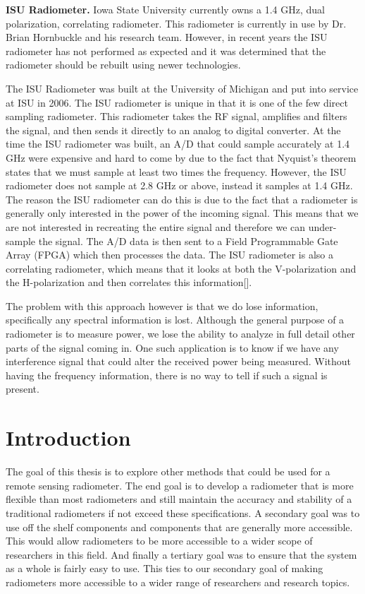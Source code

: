 \textbf{ISU Radiometer.}  Iowa State University currently owns a 1.4 GHz, dual polarization, correlating radiometer.  This radiometer is currently in use by Dr. Brian Hornbuckle and his research team.  However, in recent years the ISU radiometer has not performed as expected and it was determined that the radiometer should be rebuilt using newer technologies.  

The ISU Radiometer was built at the University of Michigan and put into service at ISU in 2006.  The ISU radiometer is unique in that it is one of the few direct sampling radiometer\cite{DeRooISU}.  This radiometer takes the RF signal, amplifies and filters the signal, and then sends it directly to an analog to digital converter.  At the time the ISU radiometer was built, an A/D that could sample accurately at 1.4 GHz were expensive and hard to come by due to the fact that Nyquist's theorem states that we must sample at least two times the frequency.  However, the ISU radiometer does not sample at 2.8 GHz or above, instead it samples at 1.4 GHz.  The reason the ISU radiometer can do this is due to the fact that a radiometer is generally only interested in the power of the incoming signal.  This means that we are not interested in recreating the entire signal and therefore we can under-sample the signal.  The A/D data is then sent to a Field Programmable Gate Array (FPGA) which then processes the data.  The ISU radiometer is also a correlating radiometer, which means that it looks at both the V-polarization and the H-polarization and then correlates this information[\cite{Fischman2001}]. 

The problem with this approach however is that we do lose information, specifically any spectral information is lost.  Although the general purpose of a radiometer is to measure power, we lose the ability to analyze in full detail other parts of the signal coming in.  One such application is to know if we have any interference signal that could alter the received power being measured.  Without having the frequency information, there is no way to tell if such a signal is present.

\section{Introduction}
The goal of this thesis is to explore other methods that could be used for a remote sensing radiometer.  The end goal is to develop a radiometer that is more flexible than most radiometers and still maintain the accuracy and stability of a traditional radiometers if not exceed these specifications.  A secondary goal was to use off the shelf components and components that are generally more accessible.  This would allow radiometers to be more accessible to a wider scope of researchers in this field.  And finally a tertiary goal was to ensure that the system as a whole is fairly easy to use.  This ties to our secondary goal of making radiometers more accessible to a wider range of researchers and research topics.

